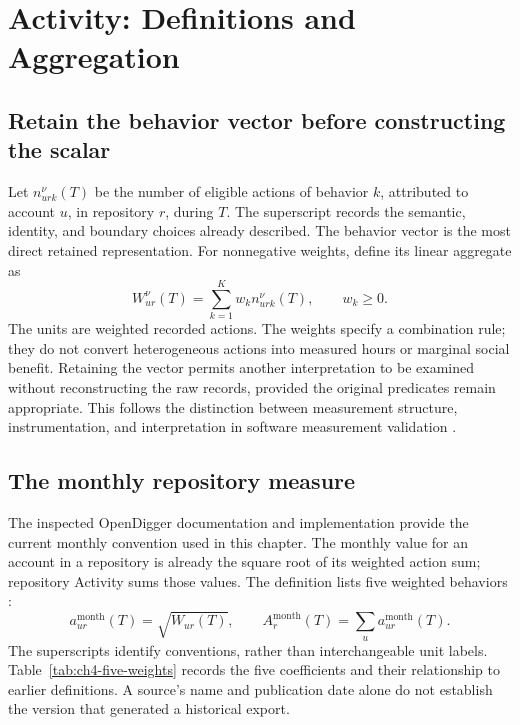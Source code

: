 \section{Activity: Definitions and Aggregation}
\label{sec:ch4-activity}

\subsection{Retain the behavior vector before constructing the scalar}
Let \(n_{urk}^{\nu}(T)\) be the number of eligible actions of behavior \(k\), attributed to account \(u\), in repository \(r\), during \(T\). The superscript records the semantic, identity, and boundary choices already described. The behavior vector is the most direct retained representation. For nonnegative weights, define its linear aggregate as
\begin{equation}
W_{ur}^{\nu}(T)=\sum_{k=1}^{K}w_k n_{urk}^{\nu}(T),
\qquad w_k\geq 0.
\label{eq:ch4-weighted}
\end{equation}
The units are weighted recorded actions. The weights specify a combination rule; they do not convert heterogeneous actions into measured hours or marginal social benefit. Retaining the vector permits another interpretation to be examined without reconstructing the raw records, provided the original predicates remain appropriate. This follows the distinction between measurement structure, instrumentation, and interpretation in software measurement validation \citep{kitchenham1995}.

\subsection{The monthly repository measure}
The inspected OpenDigger documentation and implementation provide the current monthly convention used in this chapter. The monthly value for an account in a repository is already the square root of its weighted action sum; repository Activity sums those values. The definition lists five weighted behaviors \citep{diggerdocs2026}:
\begin{equation}
a_{ur}^{\mathrm{month}}(T)=\sqrt{W_{ur}(T)},
\qquad
A_r^{\mathrm{month}}(T)=\sum_u a_{ur}^{\mathrm{month}}(T).
\label{eq:ch4-doc-activity}
\end{equation}
The superscripts identify conventions, rather than interchangeable unit labels. Table~\ref{tab:ch4-five-weights} records the five coefficients and their relationship to earlier definitions. A source's name and publication date alone do not establish the version that generated a historical export.

